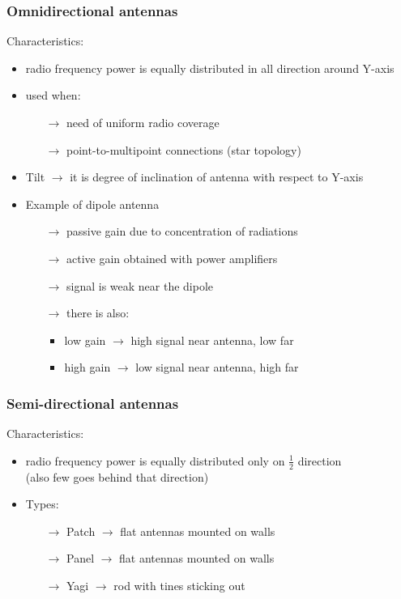 \subsubsection{Omnidirectional antennas}

Characteristics:
\begin{itemize}
    \item radio frequency power is equally distributed in all direction around
    Y-axis
    \item used when:
    \begin{itemize}
        \vspace{-0.1cm}\item[$\rightarrow$] need of uniform radio coverage
        \vspace{-0.1cm}\item[$\rightarrow$] point-to-multipoint connections (star topology)
    \end{itemize}
    \item Tilt $\rightarrow$ it is degree of inclination of antenna with respect to Y-axis
    \item Example of dipole antenna
    \begin{itemize}
        \item[$\rightarrow$] passive gain due to concentration of radiations
        \item[$\rightarrow$] active gain obtained with power amplifiers
        \item[$\rightarrow$] signal is weak near the dipole
        \item[$\rightarrow$] there is also:
        \begin{itemize}
            \setlength\itemsep{0.0000001em}
            \vspace{-0.1cm}\item low gain $\rightarrow$ high signal near antenna, low far
            \vspace{-0.1cm}\item high gain $\rightarrow$ low signal near antenna, high far
        \end{itemize}
    \end{itemize}
\end{itemize} 
\subsubsection{Semi-directional antennas}

Characteristics:
\begin{itemize}
    \item radio frequency power is equally distributed only on $\frac{1}{2}$ direction\\
    (also few goes behind that direction)
    \item Types:
    \begin{itemize}
        \item[$\rightarrow$] Patch $\rightarrow$ flat antennas mounted on walls
        \item[$\rightarrow$] Panel $\rightarrow$ flat antennas mounted on walls
        \item[$\rightarrow$] Yagi $\rightarrow$ rod with tines sticking out 
    \end{itemize}
\end{itemize}
